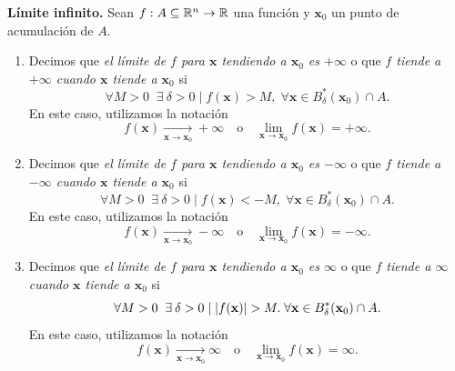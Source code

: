 \begin{definition}\textbf{L\'imite infinito.} \label{def:lim_inf}
  Sean $f : A  \subseteq  \mathbb{R}^n \to \mathbb{R}$ una funci\'on y $\mathbf{x}_0$ un punto de acumulaci\'on de $A$. 
  \begin{enumerate} %
   \item Decimos que \emph{el l\'imite de $f$ para $\mathbf{x}$ tendiendo a $\mathbf{x}_0$ es $+\infty$} o que \emph{$f$ tiende a $+\infty$ cuando $\mathbf{x}$ tiende a $\mathbf{x}_0$} si
    \[
      \forall M > 0\;\;\exists\: \delta > 0\;|\;f(\mathbf{x}) > M, \; \forall 
	  \mathbf{x} \in B_{\delta}^*(\mathbf{x}_0) \cap A.
    \]
    En este caso, utilizamos la notaci\'on
    \[
      f(\mathbf{x}) \xrightarrow[\mathbf{x} \to \mathbf{x}_0]{} +\infty \quad \text{o} \quad \lim_{\mathbf{x} \to \mathbf{x}_0} f(\mathbf{x}) = +\infty.
    \]
   \item Decimos que \emph{el l\'imite de $f$ para $\mathbf{x}$ tendiendo a $\mathbf{x}_0$ es $-\infty$} o que \emph{$f$ tiende a $-\infty$ cuando $\mathbf{x}$ tiende a $\mathbf{x}_0$} si
    \[
      \forall M > 0\;\;\exists\: \delta > 0 \;|\; f(\mathbf{x}) < -M, \; \forall 
	  \mathbf{x} \in B_{\delta}^*(\mathbf{x}_0) \cap A.
    \]
    En este caso, utilizamos la notaci\'on
    \[
      f(\mathbf{x}) \xrightarrow[\mathbf{x} \to \mathbf{x}_0]{} -\infty \quad \text{o} \quad \lim_{\mathbf{x} \to \mathbf{x}_0} f(\mathbf{x}) = -\infty.
    \]
   \item Decimos que \emph{el l\'imite de $f$ para $\mathbf{x}$ tendiendo a $\mathbf{x}_0$ es $\infty$} o que \emph{$f$ tiende a $\infty$ cuando $\mathbf{x}$ tiende a $\mathbf{x}_0$} si
    \[
      \forall M > 0 \;\; \exists\: \delta > 0 \;|\; \abs{f(\mathbf{x})} > M.\; \forall \mathbf{x} \in B_{\delta}^*(\mathbf{x}_0) \cap A.
    \]
    En este caso, utilizamos la notaci\'on
    \[
      f(\mathbf{x}) \xrightarrow[\mathbf{x} \to \mathbf{x}_0]{} \infty \quad \text{o} \quad \lim_{\mathbf{x} \to \mathbf{x}_0} f(\mathbf{x}) = \infty.
    \]
  \end{enumerate}
\end{definition}

